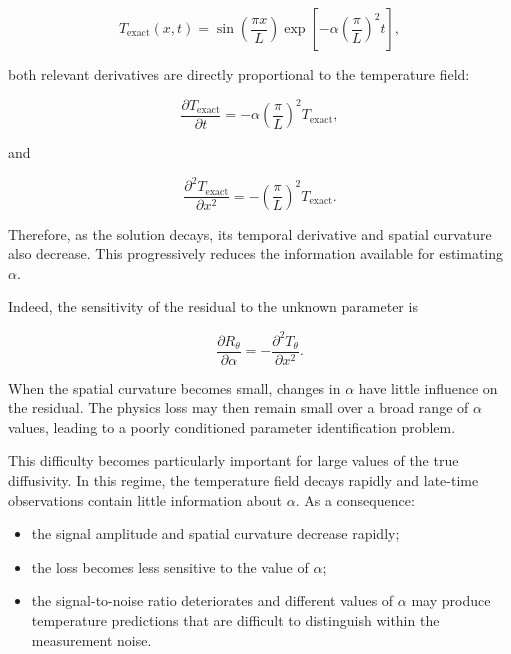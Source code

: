 \begin{equation}
T_{\mathrm{exact}}(x,t)
=
\sin\left(\frac{\pi x}{L}\right)
\exp\left[
-\alpha
\left(\frac{\pi}{L}\right)^2 t
\right],
\end{equation}

both relevant derivatives are directly proportional to the temperature field:

\begin{equation}
\frac{\partial T_{\mathrm{exact}}}{\partial t}
=
-\alpha
\left(\frac{\pi}{L}\right)^2
T_{\mathrm{exact}},
\end{equation}

and

\begin{equation}
\frac{\partial^2 T_{\mathrm{exact}}}{\partial x^2}
=
-
\left(\frac{\pi}{L}\right)^2
T_{\mathrm{exact}}.
\end{equation}

Therefore, as the solution decays, its temporal derivative and spatial
curvature also decrease. This progressively reduces the information available
for estimating $\alpha$.

Indeed, the sensitivity of the residual to the unknown parameter is

\begin{equation}
\frac{\partial R_\theta}{\partial \alpha}
=
-
\frac{\partial^2 T_\theta}{\partial x^2}.
\end{equation}

When the spatial curvature becomes small, changes in $\alpha$ have little
influence on the residual. The physics loss may then remain small over a broad
range of $\alpha$ values, leading to a poorly conditioned parameter
identification problem.

This difficulty becomes particularly important for large values of the true
diffusivity. In this regime, the temperature field decays rapidly and
late-time observations contain little information about $\alpha$. As a
consequence:

\begin{itemize}
    \item the signal amplitude and spatial curvature decrease rapidly;
     \item the loss becomes less sensitive to the value of $\alpha$;
    \item the signal-to-noise ratio deteriorates and different values of $\alpha$ may produce temperature predictions
    that are difficult to distinguish within the measurement noise.
\end{itemize}

